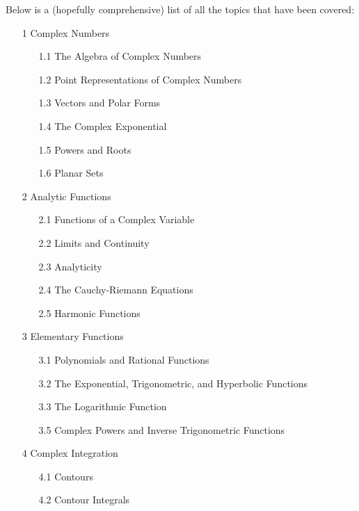 Below is a (hopefully comprehensive) list of all the topics that have been covered:
\begin{enumerate}
    \item[1] Complex Numbers
        \begin{enumerate}
            \item[1.1] The Algebra of Complex Numbers
            \item[1.2] Point Representations of Complex Numbers
            \item[1.3] Vectors and Polar Forms
            \item[1.4] The Complex Exponential
            \item[1.5] Powers and Roots
            \item[1.6] Planar Sets
        \end{enumerate}
    \item[2] Analytic Functions
        \begin{enumerate}
            \item[2.1] Functions of a Complex Variable
            \item[2.2] Limits and Continuity
            \item[2.3] Analyticity
            \item[2.4] The Cauchy-Riemann Equations
            \item[2.5] Harmonic Functions
        \end{enumerate}
    \item[3] Elementary Functions
        \begin{enumerate}
            \item[3.1] Polynomials and Rational Functions
            \item[3.2] The Exponential, Trigonometric, and Hyperbolic Functions
            \item[3.3] The Logarithmic Function
            \item[3.5] Complex Powers and Inverse Trigonometric Functions
        \end{enumerate}
    \item[4] Complex Integration
        \begin{enumerate}
            \item[4.1] Contours
            \item[4.2] Contour Integrals
        \end{enumerate}
\end{enumerate}
